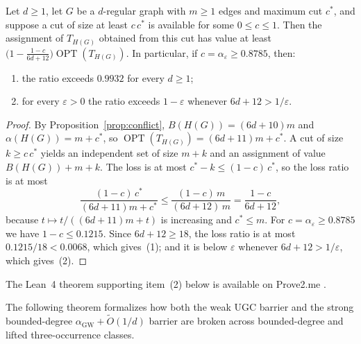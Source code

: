 \documentclass[preprints,article,accept,oneauthor,pdftex]{Definitions/mdpi}
\begin{document}
\begin{Lemma}\label{lem:strong-lift}
Let $d \ge 1$, let $G$ be a $d$-regular graph with $m \ge 1$ edges and maximum cut $c^\ast$, and suppose a cut of size at least $c\,c^\ast$ is available for some $0 \le c \le 1$. Then the assignment of $T_{H(G)}$ obtained from this cut has value at least $\bigl(1 - \frac{1-c}{6d+12}\bigr)\operatorname{OPT}(T_{H(G)})$. In particular, if $c = \alpha_\varepsilon \ge 0.8785$, then:
\begin{enumerate}
\item the ratio exceeds $0.9932$ for every $d \ge 1$;
\item for every $\varepsilon > 0$ the ratio exceeds $1 - \varepsilon$ whenever $6d+12 > 1/\varepsilon$.
\end{enumerate}
\end{Lemma}

\begin{proof}
By Proposition~\ref{prop:conflict}, $B(H(G)) = (6d+10)m$ and $\alpha(H(G)) = m + c^\ast$, so $\operatorname{OPT}(T_{H(G)}) = (6d+11)m + c^\ast$. A cut of size $k \ge c\,c^\ast$ yields an independent set of size $m+k$ and an assignment of value $B(H(G)) + m + k$. The loss is at most $c^\ast - k \le (1-c)\,c^\ast$, so the loss ratio is at most
\[
\frac{(1-c)\,c^\ast}{(6d+11)m + c^\ast} \le \frac{(1-c)\,m}{(6d+12)\,m} = \frac{1-c}{6d+12},
\]
because $t \mapsto t/((6d+11)m + t)$ is increasing and $c^\ast \le m$. For $c = \alpha_\varepsilon \ge 0.8785$ we have $1-c \le 0.1215$. Since $6d+12 \ge 18$, the loss ratio is at most $0.1215/18 < 0.0068$, which gives~(1); and it is below $\varepsilon$ whenever $6d+12 > 1/\varepsilon$, which gives~(2).
\end{proof}

The Lean~4 theorem supporting item~(2) below is available on Prove2.me \cite{VegaProve2MeStrongUgcBroken2026}.

The following theorem formalizes how both the weak UGC barrier and the strong bounded-degree $\alpha_{\mathrm{GW}} + \widetilde{O}(1/d)$ barrier are broken across bounded-degree and lifted three-occurrence classes.
\end{document}
